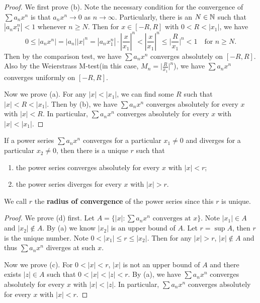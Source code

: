 \documentclass[a4paper]{ctexart}
\begin{document}
    \begin{proof}
        We first prove (b). Note the necessary condition for the convergence of $\sum a_n x^n$ is that $a_n x^n \to 0$ as $n\to \infty$. Particularly, there is an $N\in \mathbb{N}$ such that $|a_n x_1^n| < 1$ whenever $n\ge N$. Then for $x\in [-R,R]$ with $0<R<|x_1|$, we have
        $$ 0\le |a_n x^n| = |a_n||x|^n = |a_n x_1^n| \cdot \left|\frac{x}{x_1}\right|^n < \left|\frac{x}{x_1}\right|^n\le \Big| \frac{R}{x_1}\Big|^n < 1 \quad \text{for } n\ge N. $$
        Then by the comparison test, we have $\sum a_n x^n$ converges absolutely on $[-R,R]$. Also by the Weierstrass M-test(in this case, $M_n = \displaystyle\Big| \frac{R}{x_1}\Big|^n$), we have $\sum a_n x^n$ converges uniformly on $[-R,R]$.

        Now we prove (a). For any $|x|<|x_1|$, we can find some $R$ such that $|x| < R < |x_1|$. Then by (b), we have $\sum a_n x^n$ converges absolutely for every $x$ with $|x| < R$. In particular, $\sum a_n x^n$ converges absolutely for every $x$ with $|x| < |x_1|$.
    \end{proof}
    \begin{mythm}\label{radius_of_convergence}
        If a power series $\sum a_n x^n$ converges for a particular $x_1 \neq 0$ and diverges for a particular $x_2 \neq 0$, then there is a unique $r$ such that
        \begin{enumerate}[label=(\alph*),start=3]
            \item the power series converges absolutely for every $x$ with $|x| < r$;
            \item the power series diverges for every $x$ with $|x| > r$.
        \end{enumerate}
        We call $r$ the \textbf{radius of convergence} of the power series since this $r$ is unique.
    \end{mythm}
    \begin{proof}
        We prove (d) first. Let $A=\{ |x| : \displaystyle \sum a_n x^n \text{ converges at } x\}$. Note $|x_1|\in A$ and $|x_2|\notin A$. By (a) we know $|x_2|$ is an upper bound of $A$. Let $r = \sup A$, then $r$ is the unique number. Note $0<|x_1| \le r \le |x_2|$. Then for any $|x|>r$, $|x|\notin A$ and thus $\sum a_n x^n$ diverges at such $x$.

        Now we prove (c). For $0<|x|<r$, $|x|$ is not an upper bound of $A$ and there exists $|z| \in A$ such that $0<|x| < |z| < r$. By (a), we have $\sum a_n x^n$ converges absolutely for every $x$ with $|x| < |z|$. In particular, $\sum a_n x^n$ converges absolutely for every $x$ with $|x| < r$.
    \end{proof}
\end{document}
